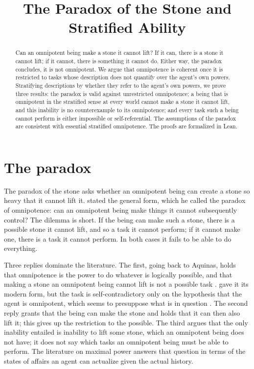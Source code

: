 \documentclass{situationist-preprint}
\title{The Paradox of the Stone and Stratified Ability}
\begin{document}
\maketitle

\begin{abstract}
Can an omnipotent being make a stone it cannot lift? If it can, there is a stone it cannot lift; if it cannot, there is something it cannot do. Either way, the paradox concludes, it is not omnipotent. We argue that omnipotence is coherent once it is restricted to tasks whose description does not quantify over the agent's own powers. Stratifying descriptions by whether they refer to the agent's own powers, we prove three results: the paradox is valid against unrestricted omnipotence; a being that is omnipotent in the stratified sense at every world cannot make a stone it cannot lift, and this inability is no counterexample to its omnipotence; and every task such a being cannot perform is either impossible or self-referential. The assumptions of the paradox are consistent with essential stratified omnipotence. The proofs are formalized in Lean.
\end{abstract}

\section{The paradox}

The paradox of the stone asks whether an omnipotent being can create a stone so heavy that it cannot lift it. \citet{Mackie1955} stated the general form, which he called the paradox of omnipotence: can an omnipotent being make things it cannot subsequently control? The dilemma is short. If the being can make such a stone, there is a possible stone it cannot lift, and so a task it cannot perform; if it cannot make one, there is a task it cannot perform. In both cases it fails to be able to do everything.

Three replies dominate the literature. The first, going back to Aquinas, holds that omnipotence is the power to do whatever is logically possible, and that making a stone an omnipotent being cannot lift is not a possible task \citep[I, q.~25, a.~3]{Aquinas}. \citet{Mavrodes1963} gave it its modern form, but the task is self-contradictory only on the hypothesis that the agent is omnipotent, which seems to presuppose what is in question \citep{Savage1967}. The second reply \citep{Frankfurt1964} grants that the being can make the stone and holds that it can then also lift it; this gives up the restriction to the possible. The third \citep{Savage1967} argues that the only inability entailed is inability to lift some stone, which an omnipotent being does not have; it does not say which tasks an omnipotent being must be able to perform. The literature on maximal power \citep{FlintFreddoso1983,Wierenga1989} answers that question in terms of the states of affairs an agent can actualize given the actual history.
\end{document}
